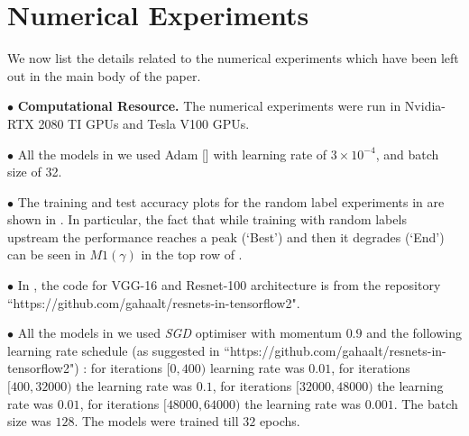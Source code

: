 \newpage
\appendix

\section{Numerical Experiments}
We now list the details related to the numerical experiments which have been left out in the main body of the paper.

\indent \quad $\bullet$ \textbf{Computational Resource.} The numerical experiments were run in Nvidia-RTX 2080 TI GPUs and Tesla V100 GPUs.

\indent \quad $\bullet$ All the models in  we used Adam [] with learning rate of $3\times 10^{-4}$, and batch size of 32.



\indent \quad $\bullet$ The training and test accuracy plots for the random label experiments in  are shown in . In particular, the fact that while training with random labels upstream the performance reaches a peak (`Best') and then it degrades (`End') can be seen in $M1(\gamma)$ in the top row of . 


\indent \quad $\bullet$ In , the code for VGG-16 and Resnet-100 architecture is from the repository ``https://github.com/gahaalt/resnets-in-tensorflow2".

\indent \quad $\bullet$ All the models in  we used \emph{SGD} optimiser with momentum $0.9$ and the following learning rate schedule (as suggested in ``https://github.com/gahaalt/resnets-in-tensorflow2") : for iterations $[0, 400)$ learning rate was $0.01$,  for iterations $[400, 32000)$ the learning rate was $ 0.1$, for iterations $[32000, 48000)$ the learning rate was $0.01$, for iterations $[48000, 64000)$ the learning rate was $0.001$. The batch size was $128$. The models were trained till $32$ epochs.
